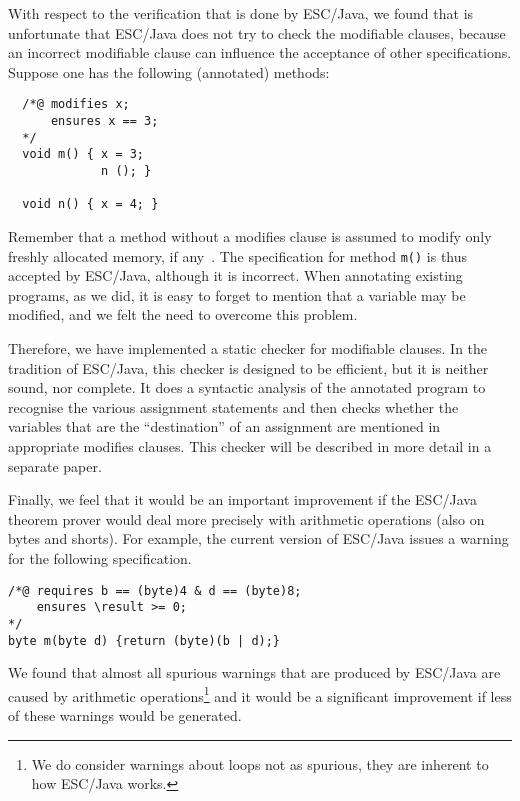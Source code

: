 \documentclass[a4paper]{llncs}
\begin{document}
With respect to the verification that is done by ESC/Java, we found
that is unfortunate that ESC/Java does not try to check the modifiable
clauses, because an incorrect modifiable clause can influence the
acceptance of other specifications. Suppose one has the following
(annotated) methods$:$
\begin{verbatim}
  /*@ modifies x;
      ensures x == 3;
  */
  void m() { x = 3;
             n (); }

  void n() { x = 4; }
\end{verbatim}
Remember that a method without a modifies clause is assumed to modify
only freshly allocated memory, if any~\cite{LeinoNS00}. The
specification for method \texttt{m()} is thus accepted by ESC/Java,
although it is incorrect. When annotating existing programs, as we
did, it is easy to forget to mention that a variable may be modified,
and we felt the need to overcome this problem.

Therefore, we have implemented a static checker for modifiable
clauses. In the tradition of ESC/Java, this checker is designed to be
efficient, but it is neither sound, nor complete. It does a syntactic
analysis of the annotated program to recognise the various assignment
statements and then checks whether the variables that are the
``destination'' of an assignment are mentioned in appropriate modifies
clauses. This checker will be described in more detail in a separate
paper.

Finally, we feel that it would be an important improvement if the
ESC/Java theorem prover would deal more precisely with arithmetic
operations (also on bytes and shorts). For example, the current
version of ESC/Java issues a warning for the following specification.
\begin{verbatim}
/*@ requires b == (byte)4 & d == (byte)8;
    ensures \result >= 0;
*/
byte m(byte d) {return (byte)(b | d);}
\end{verbatim}
We found that almost all spurious warnings that are produced by
ESC/Java are caused by arithmetic operations\footnote{We do consider
warnings about loops not as spurious, they are inherent to how
ESC/Java works.} and it would be a significant improvement if less of
these warnings would be generated.

\end{document}
